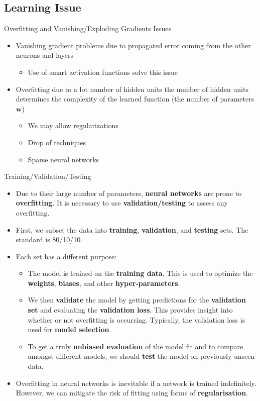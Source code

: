 \documentclass[10pt, hyperref={colorlinks = true,linkcolor = blue}]{beamer}
\begin{document}
{{{\subsection{Learning Issue}

\begin{frame} {Overfitting and Vanishing/Exploding Gradients  Issues}
\begin{itemize}
\item  Vanishing gradient problems due to propagated error coming from the other neurons and layers
\begin{itemize}
\item Use of smart activation functions solve this issue 
\end{itemize}
\item Overfitting due to a lot number of hidden units the number of hidden units determines the complexity of the learned function (the number of parameters $\bm w$)
\begin{itemize}
\item We may allow regularizations 
\item Drop of techniques 
\item Sparse neural networks 
\end{itemize} 
\end{itemize}
\end{frame}


\begin{frame}{Training/Validation/Testing}
\begin{itemize}
    \item Due to their large number of parameters, \textbf{neural networks} are prone to \textbf{overfitting}. It is necessary to use \textbf{validation/testing} to assess any overfitting.
    \item First, we subset the data into \textbf{training}, \textbf{validation}, and \textbf{testing} sets. The standard is 80/10/10.
    \item Each set has a different purpose:
    \begin{itemize}
        \item The model is trained on the \textbf{training data}. This is used to optimize the \textbf{weights}, \textbf{biases}, and other \textbf{hyper-parameters}.
        \item We then \textbf{validate} the model by getting predictions for the \textbf{validation set} and evaluating the \textbf{validation loss}. This provides insight into whether or not overfitting is occurring. Typically, the validation loss is used for \textbf{model selection}.
        \item To get a truly \textbf{unbiased evaluation} of the model fit and to compare amongst different models, we should \textbf{test} the model on previously unseen data.
    \end{itemize}
\item Overfitting in neural networks is inevitable if a network is trained
indefinitely. However, we can mitigate the risk of fitting using forms of \textbf{regularisation}. 
\end{itemize}
\end{frame}


}}}
\end{document}
